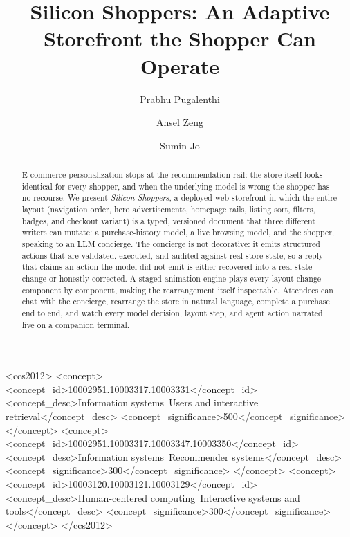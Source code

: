 \documentclass[sigconf, screen, review]{acmart}
\begin{document}
\title{Silicon Shoppers: An Adaptive Storefront the Shopper Can Operate}

\author{Prabhu Pugalenthi}

\author{Ansel Zeng}

\author{Sumin Jo}

\begin{abstract}
E-commerce personalization stops at the recommendation rail: the store itself looks identical for every shopper, and when the underlying model is wrong the shopper has no recourse. We present \emph{Silicon Shoppers}, a deployed web storefront in which the entire layout (navigation order, hero advertisements, homepage rails, listing sort, filters, badges, and checkout variant) is a typed, versioned document that three different writers can mutate: a purchase-history model, a live browsing model, and the shopper, speaking to an LLM concierge. The concierge is not decorative: it emits structured actions that are validated, executed, and audited against real store state, so a reply that claims an action the model did not emit is either recovered into a real state change or honestly corrected. A staged animation engine plays every layout change component by component, making the rearrangement itself inspectable. Attendees can chat with the concierge, rearrange the store in natural language, complete a purchase end to end, and watch every model decision, layout step, and agent action narrated live on a companion terminal.
\end{abstract}

\begin{CCSXML}
<ccs2012>
<concept>
<concept_id>10002951.10003317.10003331</concept_id>
<concept_desc>Information systems~Users and interactive retrieval</concept_desc>
<concept_significance>500</concept_significance>
</concept>
<concept>
<concept_id>10002951.10003317.10003347.10003350</concept_id>
<concept_desc>Information systems~Recommender systems</concept_desc>
<concept_significance>300</concept_significance>
</concept>
<concept>
<concept_id>10003120.10003121.10003129</concept_id>
<concept_desc>Human-centered computing~Interactive systems and tools</concept_desc>
<concept_significance>300</concept_significance>
</concept>
</ccs2012>
\end{CCSXML}
\end{document}
